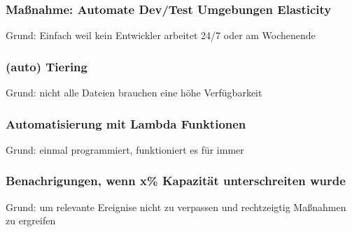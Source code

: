 \subsubsection{Maßnahme: Automate Dev/Test Umgebungen Elasticity}
Grund: Einfach weil kein Entwickler arbeitet 24/7 oder am Wochenende

\subsubsection{(auto) Tiering }
Grund: nicht alle Dateien brauchen eine höhe Verfügbarkeit

\subsubsection{Automatisierung mit Lambda Funktionen}
Grund: einmal programmiert, funktioniert es für immer

\subsubsection{Benachrigungen, wenn x\% Kapazität unterschreiten wurde}
Grund: um relevante Ereignise nicht zu verpassen und rechtzeigtig Maßnahmen zu ergreifen



  